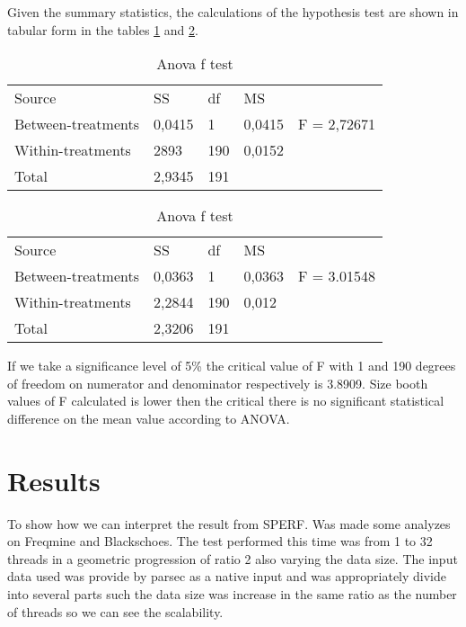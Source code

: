 \documentclass[sigconf]{acmart}
\begin{document}
Given the summary statistics, the calculations of the hypothesis test are shown in tabular form in the tables \ref{tab:blackAnova} and \ref{tab:freqsAnova}.

\begin{table}[H]
\centering
\caption{Anova f test}
\label{tab:blackAnova}
\begin{tabular}{lllll}
Source             & SS     & df  & MS     &             \\
Between-treatments & 0,0415 & 1   & 0,0415 & F = 2,72671 \\
Within-treatments  & 2893   & 190 & 0,0152 &             \\
Total              & 2,9345 & 191 &        &            
\end{tabular}
\end{table}

\begin{table}[H]
\centering
\caption{Anova f test}
\label{tab:freqsAnova}
\begin{tabular}{lllll}
Source             & SS     & df  & MS     &             \\
Between-treatments & 0,0363 & 1   & 0,0363 & F = 3.01548 \\
Within-treatments  & 2,2844 & 190 & 0,012  &             \\
Total              & 2,3206 & 191 &        &            
\end{tabular}
\end{table}

If we take a significance level of 5\% the critical value of F with 1 and 190 degrees of freedom on numerator and denominator respectively is 3.8909. Size booth values of F calculated is lower then the critical there is no significant statistical difference on the mean value according to ANOVA.



\section{Results}
\label{sec:results}

To show how we can interpret the result from SPERF. Was made some analyzes on Freqmine and Blackschoes. The test performed this time was from 1 to 32 threads in a  geometric progression of ratio 2 also varying the data size. The input data used was provide by parsec as a native input and was appropriately divide into several parts such the data size was increase in the same ratio as the number of threads so we can see the scalability.
\end{document}
